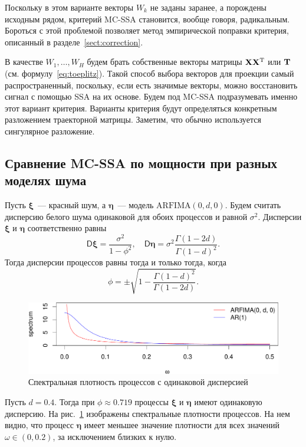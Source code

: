 \documentclass[specialist,
substylefile = spbu_report.rtx,
subf,href,colorlinks=true, 12pt]{disser}
\theoremstyle{definition}
\begin{document}
Поскольку в этом варианте векторы $W_k$ не заданы заранее, а порождены исходным рядом, критерий MC-SSA становится, вообще говоря, радикальным. Бороться с этой проблемой позволяет метод эмпирической поправки критерия, описанный в разделе~\ref{sect:correction}.

В качестве $W_1, \ldots,W_H$ будем брать собственные векторы матрицы $\mathbf{X}\mathbf{X}^{\mathrm{T}}$ или $\mathbf{T}$ (см. формулу~\eqref{eq:toeplitz}). Такой способ выбора векторов для проекции самый распространенный, поскольку, если есть значимые векторы, можно восстановить сигнал с помощью SSA на их основе. Будем под MC-SSA подразумевать именно этот вариант критерия. Варианты критерия будут определяться конкретным разложением траекторной матрицы. Заметим, что обычно используется сингулярное разложение.


\subsection{Сравнение MC-SSA по мощности при разных моделях шума}
Пусть $\bm \xi$~--- красный шум, а $\bm \eta$~--- модель $\mathrm{ARFIMA}(0, d, 0)$. Будем считать дисперсию белого шума одинаковой для обоих процессов и равной $\sigma^2$. Дисперсии $\bm\xi$ и $\bm\eta$ соответственно равны
\[
	\mathsf{D}\bm\xi = \frac{\sigma^2}{1 - \phi^2}, \quad \mathsf{D}\bm\eta = \sigma^2\frac{\Gamma(1 - 2d)}{\Gamma(1-d)^2}.
\]
Тогда дисперсии процессов равны тогда и только тогда, когда
\[
	\phi=\pm\sqrt{1-\frac{\Gamma(1-d)^2}{\Gamma(1-2d)}}.
\]

\begin{figure}[h]
	\includegraphics[width=\textwidth]{img/spectrum.pdf}
	\caption{Спектральная плотность процессов с одинаковой дисперсией}
	\label{fig:spectrum}
\end{figure}

Пусть $d=0.4$. Тогда при $\phi\approx0.719$ процессы $\bm\xi$ и $\bm\eta$ имеют одинаковую дисперсию. На рис.~\ref{fig:spectrum} изображены спектральные плотности процессов. На нем видно, что процесс $\bm\eta$ имеет меньшее значение плотности для всех значений $\omega\in(0, 0.2)$, за исключением близких к нулю.
\end{document}
